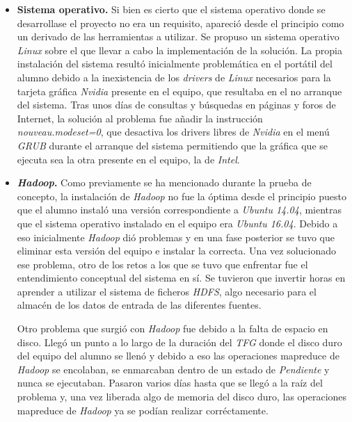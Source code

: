 \begin{itemize}

\item \textbf{Sistema operativo.} Si bien es cierto que el sistema operativo donde se desarrollase el proyecto no era un requisito, apareció desde el principio como un derivado de las herramientas a utilizar. Se propuso un sistema operativo \textit{Linux} \cite{wikilinux} sobre el que llevar a cabo la implementación de la solución. 
La propia instalación del sistema resultó inicialmente problemática en el portátil del alumno debido a la inexistencia de los \textit{drivers} de \textit{Linux} necesarios para la tarjeta gráfica \textit{Nvidia} \cite{wikinvidia} presente en el equipo, que resultaba en el no arranque del sistema. Tras unos días de consultas y búsquedas en páginas y foros de Internet, la solución al problema fue añadir la instrucción \textit{nouveau.modeset=0}, que desactiva los drivers libres de \textit{Nvidia} en el menú \textit{GRUB} \cite{grub} durante el arranque del sistema permitiendo que la gráfica que se ejecuta sea la otra presente en el equipo, la de \textit{Intel}.

\item \textbf{\textit{Hadoop}.} Como previamente se ha mencionado durante la prueba de concepto, la instalación de \textit{Hadoop} no fue la óptima desde el principio puesto que el alumno instaló una versión correspondiente a \textit{Ubuntu 14.04}, mientras que el sistema operativo instalado en el equipo era \textit{Ubuntu 16.04}. Debido a eso inicialmente \textit{Hadoop} dió problemas y en una fase posterior se tuvo que eliminar esta versión del equipo e instalar la correcta. Una vez solucionado ese problema, otro de los retos a los que se tuvo que enfrentar fue el entendimiento conceptual del sistema en sí. Se tuvieron que invertir horas en aprender a utilizar el sistema de ficheros \textit{HDFS}, algo necesario para el almacén de los datos de entrada de las diferentes fuentes. 
\par
Otro problema que surgió con \textit{Hadoop} fue debido a la falta de espacio en disco. Llegó un punto a lo largo de la duración del \textit{TFG} donde el disco duro del equipo del alumno se llenó y debido a eso las operaciones \gls{mapreduce} de \textit{Hadoop} se encolaban, se enmarcaban dentro de un estado de \textit{Pendiente} y nunca se ejecutaban. Pasaron varios días hasta que se llegó a la raíz del problema y, una vez liberada algo de memoria del disco duro, las operaciones \gls{mapreduce} de \textit{Hadoop} ya se podían realizar corréctamente. 


\end{itemize}
